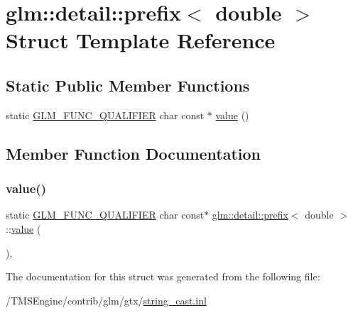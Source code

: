 \hypertarget{structglm_1_1detail_1_1prefix_3_01double_01_4}{}\section{glm\+:\+:detail\+:\+:prefix$<$ double $>$ Struct Template Reference}
\label{structglm_1_1detail_1_1prefix_3_01double_01_4}
\subsection*{Static Public Member Functions}
\begin{DoxyCompactItemize}
\item 
static \hyperlink{setup_8hpp_a33fdea6f91c5f834105f7415e2a64407}{G\+L\+M\+\_\+\+F\+U\+N\+C\+\_\+\+Q\+U\+A\+L\+I\+F\+I\+ER} char const  $\ast$ \hyperlink{structglm_1_1detail_1_1prefix_3_01double_01_4_a39aa4646d7de33a2382c92db849d6eb5}{value} ()
\end{DoxyCompactItemize}


\subsection{Member Function Documentation}
\mbox{\label{structglm_1_1detail_1_1prefix_3_01double_01_4_a39aa4646d7de33a2382c92db849d6eb5}} 
\subsubsection{\texorpdfstring{value()}{value()}}
{\footnotesize\ttfamily static \hyperlink{setup_8hpp_a33fdea6f91c5f834105f7415e2a64407}{G\+L\+M\+\_\+\+F\+U\+N\+C\+\_\+\+Q\+U\+A\+L\+I\+F\+I\+ER} char const$\ast$ \hyperlink{structglm_1_1detail_1_1prefix}{glm\+::detail\+::prefix}$<$ double $>$\+::\hyperlink{_s_d_l__opengl__glext_8h_a8ad81492d410ff2ac11f754f4042150f}{value} (\begin{DoxyParamCaption}{ }\end{DoxyParamCaption})\hspace{0.3cm}{\ttfamily [inline]}, {\ttfamily [static]}}



The documentation for this struct was generated from the following file\+:\begin{DoxyCompactItemize}
\item 
/\+T\+M\+S\+Engine/contrib/glm/gtx/\hyperlink{string__cast_8inl}{string\+\_\+cast.\+inl}\end{DoxyCompactItemize}
